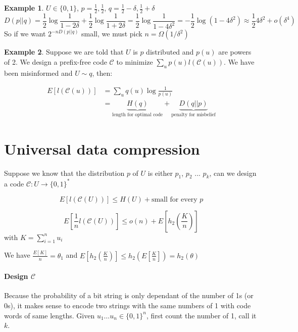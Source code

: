 \documentclass[twoside]{article}
\theoremstyle{definition} %
\newtheorem{example}{Example}
\newcommand{\Ex}[1]{E\left[#1\right]}
\newcommand{\pfrac}[2]{\left( \frac{#1}{#2} \right)}
\def\C{\mathcal{C}}
\begin{document}
\begin{example}
  $U \in \{0,1\}$, $p=\frac 1 2, \frac 1 2$, $q=\frac 1 2 - \delta, \frac 1 2 + \delta$
  \[
    D(p||q) = \frac 1 2 \log \frac 1 {1-2\delta} + \frac 1 2 \log \frac 1 {1+2\delta} = \frac 1 2 \log \frac 1 {1-4\delta^2} = - \frac 1 2 \log (1-4\delta^2) \approx \frac 1 2 4\delta^2 + o(\delta^4)
  \]
  So if we want $2^{-n D(p||q)}$ small, we must pick $n=\Omega(1/\delta^2)$
\end{example}

\begin{example}
  Suppose we are told that $U$ is $p$ distributed and $p(u)$ are powers of 2. We design a prefix-free code $\C$ to minimize $\sum_u p(u) l(\C(u))$. We have been misinformed and $U\sim q$, then:

  \begin{align*}
    \Ex{l(\C(u))}
    &= \sum_u q(u) \log \frac 1 {p(u)}\\
    &= \underbrace{H(q)}_{\text{length for optimal code}} + \underbrace{D(q||p)}_{\text{penalty for misbelief}}
  \end{align*}
\end{example}


\cleardoublepage
\section{Universal data compression}

Suppose we know that the distribution $p$ of $U$ is either $p_1$, $p_2$ ... $p_k$, can we design a code $\C: U \to \{0,1\}^*$

\[
  \Ex{l(\C(U))} \leq H(U) + \text{small for every } p
\]

\[
  \Ex{\frac 1 n l(\C(U))} \leq o(n) + \Ex{h_2 \pfrac K n}
\]
with $K = \sum_{i=1}^n u_i$

We have $\frac {\Ex{K}} n = \theta_1$ and $\Ex{h_2\pfrac K n} \leq h_2 \left(\Ex{\frac K n} \right) = h_2(\theta)$

\paragraph{Design $\C$}
Because the probability of a bit string is only dependant of the number of
1s (or 0s), it makes sense to encode two strings with the same numbers of 1
with code words of same lengths.
Given $u_1 \dots u_n \in \{0,1\}^n$, first count the number of 1, call it $k$.
\end{document}
